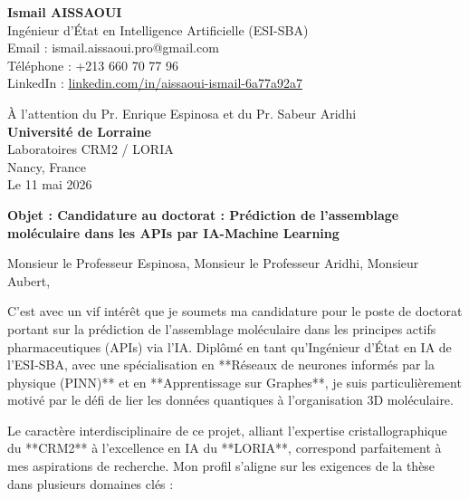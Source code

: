 \documentclass[11pt,a4paper]{article}
\begin{document}
\noindent \textbf{Ismail AISSAOUI} \\
Ingénieur d'État en Intelligence Artificielle (ESI-SBA) \\
Email : ismail.aissaoui.pro@gmail.com \\
Téléphone : +213 660 70 77 96 \\
LinkedIn : \href{https://linkedin.com/in/aissaoui-ismail-6a77a92a7}{linkedin.com/in/aissaoui-ismail-6a77a92a7}

\bigskip

\begin{flushright}
    À l'attention du Pr. Enrique Espinosa et du Pr. Sabeur Aridhi \\
    \textbf{Université de Lorraine} \\
    Laboratoires CRM2 / LORIA \\
    Nancy, France \\
    \medskip
    Le 11 mai 2026
\end{flushright}

\bigskip

\noindent \textbf{Objet : Candidature au doctorat : Prédiction de l'assemblage moléculaire dans les APIs par IA-Machine Learning}

\bigskip

Monsieur le Professeur Espinosa, Monsieur le Professeur Aridhi, Monsieur Aubert,

\medskip

C'est avec un vif intérêt que je soumets ma candidature pour le poste de doctorat portant sur la prédiction de l'assemblage moléculaire dans les principes actifs pharmaceutiques (APIs) via l'IA. Diplômé en tant qu'Ingénieur d'État en IA de l'ESI-SBA, avec une spécialisation en **Réseaux de neurones informés par la physique (PINN)** et en **Apprentissage sur Graphes**, je suis particulièrement motivé par le défi de lier les données quantiques à l'organisation 3D moléculaire.

Le caractère interdisciplinaire de ce projet, alliant l'expertise cristallographique du **CRM2** à l'excellence en IA du **LORIA**, correspond parfaitement à mes aspirations de recherche. Mon profil s'aligne sur les exigences de la thèse dans plusieurs domaines clés :
\end{document}

